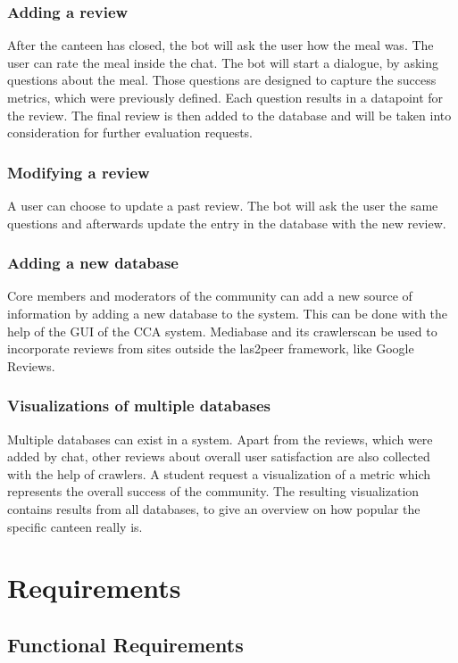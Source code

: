 \subsubsection{Adding a review} After the canteen has closed, the bot will ask the user how the meal was. The user can rate the meal inside the chat. The bot will start a dialogue, by asking questions about the meal. Those questions are designed to capture the success metrics, which were previously defined. Each question results in a datapoint for the review. The final review is then added to the database and will be taken into consideration for further evaluation requests.

\subsubsection{Modifying a review} A user can choose to update a past review. The bot will ask the user the same questions and afterwards update the entry in the database with the new review.

\subsubsection{Adding a new database} Core members and moderators of the community can add a new source of information by adding a new database to the system. This can be done with the help of the GUI of the CCA system. Mediabase and its crawlerscan be used to incorporate reviews from sites outside the las2peer framework, like Google Reviews.

\subsubsection{Visualizations of multiple databases} Multiple databases can exist in a system. Apart from the reviews, which were added by chat, other reviews about overall user satisfaction are also collected with the help of crawlers. A student request a visualization of a metric which represents the overall success of the community. The resulting visualization contains results from all databases, to give an overview on how popular the specific canteen really is.



\section{Requirements}

\subsection{Functional Requirements}

